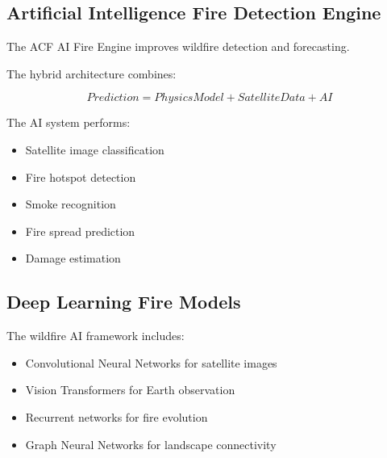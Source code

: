 
\subsection{Artificial Intelligence Fire Detection Engine}

The ACF AI Fire Engine improves wildfire detection and forecasting.

The hybrid architecture combines:

\[
Prediction=
PhysicsModel
+
SatelliteData
+
AI
\]


The AI system performs:

\begin{itemize}

\item Satellite image classification

\item Fire hotspot detection

\item Smoke recognition

\item Fire spread prediction

\item Damage estimation

\end{itemize}



\subsection{Deep Learning Fire Models}

The wildfire AI framework includes:

\begin{itemize}

\item Convolutional Neural Networks for satellite images

\item Vision Transformers for Earth observation

\item Recurrent networks for fire evolution

\item Graph Neural Networks for landscape connectivity

\end{itemize}


